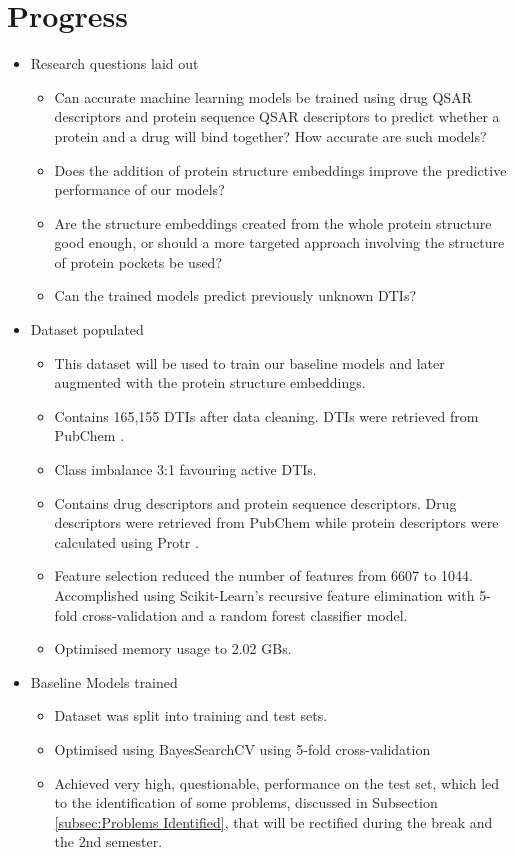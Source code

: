 \section{Progress}

\begin{itemize}
    \item 
    Research questions laid out
    \begin{itemize}
        \item 
        Can accurate machine learning models be trained using drug QSAR descriptors and protein sequence QSAR descriptors to predict whether a protein and a drug will bind together? How accurate are such models?
        \item 
        Does the addition of protein structure embeddings improve the predictive performance of our models?
        \item
        Are the structure embeddings created from the whole protein structure good enough, or should a more targeted approach involving the structure of protein pockets be used?
        \item
        Can the trained models predict previously unknown DTIs? 
    \end{itemize}

    \item
    Dataset populated
    \begin{itemize}
        \item
        This dataset will be used to train our baseline models and later augmented with the protein structure embeddings.
        \item
        Contains 165,155 DTIs after data cleaning. DTIs were retrieved from PubChem \citep{PubChem}.
        \item
        Class imbalance 3:1 favouring active DTIs.
        \item
        Contains drug descriptors and protein sequence descriptors. Drug descriptors were retrieved from PubChem \citep{PubChem} while protein descriptors were calculated using Protr \citep{ProtR_Paper}.
        \item
        Feature selection reduced the number of features from 6607 to 1044. Accomplished using Scikit-Learn's recursive feature elimination with 5-fold cross-validation \citep{RFECV} and a random forest classifier model.
        \item
        Optimised memory usage to 2.02 GBs.
    \end{itemize}

    \item
    Baseline Models trained
    \begin{itemize}
        \item
        Dataset was split into training and test sets.
        \item
        Optimised using BayesSearchCV \citep{BayesSearchCV} using 5-fold cross-validation
        \item
        Achieved very high, questionable, performance on the test set, which led to the identification of some problems, discussed in Subsection \ref{subsec:Problems Identified},  that will be rectified during the break and the 2nd semester.
    \end{itemize}


\end{itemize}
